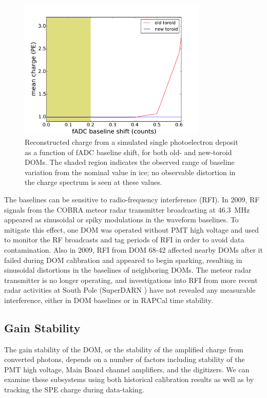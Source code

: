 \begin{figure}[!h]
 \centering
 \includegraphics[width=0.8\textwidth]{graphics/dom/reliability/charge_fadcshift.pdf}
 \caption{Reconstructed charge from a simulated single photoelectron
   deposit as a function of fADC baseline shift, for both old- and
   new-toroid DOMs. The shaded region indicates the observed range of 
   baseline variation from the nominal value in ice; no observable
   distortion in the charge spectrum is seen at these values.}
 \label{fig:charge_fadcshift}
\end{figure}

The baselines can be sensitive to radio-frequency interference (RFI). In
2009, RF signals from the COBRA meteor radar transmitter broadcasting at
46.3~MHz \cite{meteor_radar}
appeared as sinusoidal or spiky modulations in the waveform
baselines.  To mitigate this effect, one DOM was operated without PMT high
voltage and used to monitor the RF broadcasts and tag periods of RFI in
order to avoid data contamination.  Also
in 2009, RFI from DOM 68-42 affected nearby DOMs after it failed during DOM
calibration and appeared to begin sparking, resulting in sinusoidal distortions
in the baselines of neighboring DOMs. The meteor radar
transmitter is no longer operating, and investigations into RFI
from more recent radar activities at South Pole (SuperDARN
\cite{superdarn}) have not revealed any measurable interference, either in DOM
baselines or in RAPCal time stability. 

\subsection{\label{sec:gain_stability}Gain Stability}

The gain stability of the DOM, or the stability of the amplified charge
from converted photons, depends on a number of factors including stability
of the PMT high voltage, Main Board channel amplifiers, and the digitizers.
We can examine these subsystems using both historical calibration results
as well as by tracking the SPE charge during data-taking.

